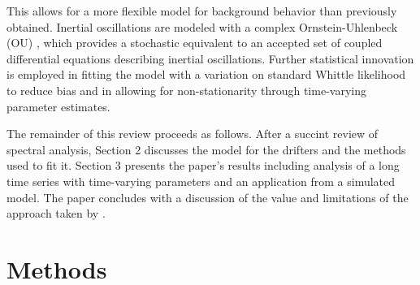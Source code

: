 \documentclass{stat572Style}
\newcommand{\vmadd}[1]{\textbf{\color{red}{#1}}}
\begin{document}
This allows for a more flexible model for background behavior than previously obtained.  
Inertial oscillations are modeled with a complex\vmadd{-domain} Ornstein-Uhlenbeck (OU) \citep{Arato1962, Jeffreys1968}, which provides a stochastic equivalent to an accepted set of coupled differential equations describing inertial oscillations. Further statistical innovation is employed in fitting the model with a variation on standard Whittle likelihood to reduce bias and in allowing for non-stationarity through time-varying parameter estimates.
\par
The remainder of this review proceeds as follows.
 After a succint review of spectral analysis, Section 2 discusses the model for the drifters and the methods used to fit it. 
 Section 3 presents the paper's results including analysis of a long time series with time-varying parameters and an application from a simulated model. 
 The paper concludes with a discussion of the value and limitations of the approach taken by \citet{Sykulski2016}. 

\section{Methods}
			
\end{document}
